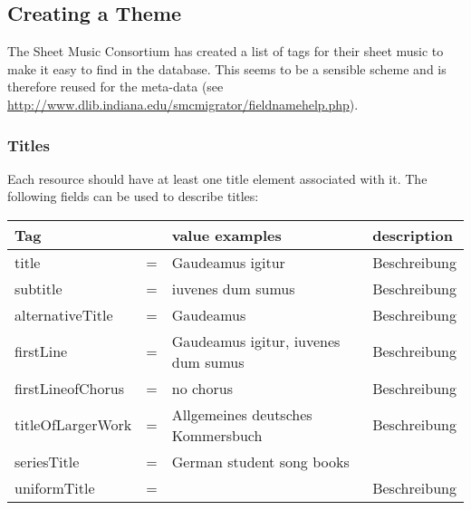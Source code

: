 \documentclass[12pt,a4paper]{scrreprt}
\begin{document}
\subsection{Creating a Theme}

The Sheet Music Consortium has created a list of tags for their sheet music to make it easy to find in the database. This seems to be a sensible scheme and is therefore reused for the meta-data (see \url{http://www.dlib.indiana.edu/smcmigrator/fieldnamehelp.php}).

\subsubsection{Titles}

\newcommand*\Tag[3]{{\ttfamily #1} & {\ttfamily =} & {\ttfamily #2} & #3}

Each resource should have at least one title element associated with it. The following fields can be used to describe titles:

\begin{tabular}{l c l  l}
Tag & & value examples & description\\
\hline
\Tag{title}{Gaudeamus igitur}{Beschreibung}\\
\Tag{subtitle}{iuvenes dum sumus}{Beschreibung}\\
\Tag{alternativeTitle}{Gaudeamus}{Beschreibung}\\
\Tag{firstLine}{Gaudeamus igitur, iuvenes dum sumus}{Beschreibung}\\
\Tag{firstLineofChorus}{no chorus}{Beschreibung}\\
\Tag{titleOfLargerWork}{Allgemeines deutsches Kommersbuch}{Beschreibung}\\
\Tag{seriesTitle}{German student song books}{}\\
\Tag{uniformTitle}{}{Beschreibung}\\
\end{tabular}

%
%
%

%

%

%
\end{document}
